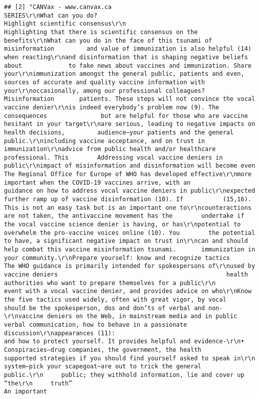 \documentclass[
]{book}
\begin{document}
\begin{verbatim}
## [2] "CANVax - www.canvax.ca                                                                                               SERIES\r\nWhat can you do?                                                      Highlight scientific consensus\r\n                                                                      Highlighting that there is scientific consensus on the benefits\r\nWhat can you do in the face of this tsunami of misinformation         and value of immunization is also helpful (14) when reacting\r\nand disinformation that is shaping negative beliefs about             to fake news about vaccines and immunization. Share your\r\nimmunization amongst the general public, patients and even,           sources of accurate and quality vaccine information with your\r\noccasionally, among our professional colleagues? Misinformation       patients. These steps will not convince the vocal vaccine denier\r\nis indeed everybody’s problem now (9). The consequences               but are helpful for those who are vaccine hesitant in your target\r\nare serious, leading to negative impacts on health decisions,         audience—your patients and the general public.\r\nincluding vaccine acceptance, and on trust in immunization\r\nadvice from public health and/or healthcare professional. This        Addressing vocal vaccine deniers in public\r\nimpact of misinformation and disinformation will become even          The Regional Office for Europe of WHO has developed effective\r\nmore important when the COVID-19 vaccines arrive, with an             guidance on how to address vocal vaccine deniers in public\r\nexpected further ramp up of vaccine disinformation (10). If           (15,16). This is not an easy task but is an important one to\r\ncounteractions are not taken, the antivaccine movement has the        undertake if the vocal vaccine science denier is having, or has\r\npotential to overwhelm the pro-vaccine voices online (10). You        the potential to have, a significant negative impact on trust in\r\ncan and should help combat this vaccine misinformation tsunami.       immunization in your community.\r\nPrepare yourself: know and recognize tactics                          The WHO guidance is primarily intended for spokespersons of\r\nused by vaccine deniers                                               health authorities who want to prepare themselves for a public\r\n                                                                      event with a vocal vaccine denier, and provides advice on who\r\nKnow the five tactics used widely, often with great vigor, by vocal   should be the spokesperson, dos and don’ts of verbal and non-\r\nvaccine deniers on the Web, in mainstream media and in public         verbal communication, how to behave in a passionate discussion\r\nappearances (11):                                                     and how to protect yourself. It provides helpful and evidence-\r\n•    Conspiracies—drug companies, the government, the health          supported strategies if you should find yourself asked to speak in\r\n     system—pick your scapegoat—are out to trick the general          public.\r\n     public; they withhold information, lie and cover up “the\r\n     truth”                                                           An important 
\end{verbatim}
\end{document}
